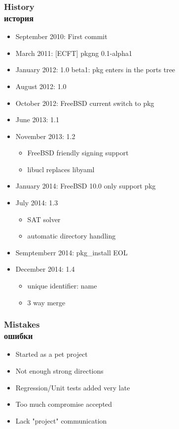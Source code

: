 \begin{frame}
	\frametitle{History \\ история}
	\begin{itemize}
		\item September 2010: First commit
		\item March 2011:  [ECFT] pkgng 0.1-alpha1
		\item January 2012: 1.0 beta1: pkg enters in the ports tree
		\item August 2012: 1.0
		\item October 2012: FreeBSD current switch to pkg
		\item June 2013: 1.1
		\item November 2013: 1.2
			\begin{itemize}
				\item FreeBSD friendly signing support
				\item libucl replaces libyaml
			\end{itemize}
		\item January 2014: FreeBSD 10.0 only support pkg
		\item July 2014: 1.3
			\begin{itemize}
				\item SAT solver
				\item automatic directory handling
			\end{itemize}
		\item Semptemberr 2014: pkg\_install EOL
		\item December 2014: 1.4
			\begin{itemize}
				\item unique identifier: name
				\item 3 way merge
			\end{itemize}
	\end{itemize}
\end{frame}

\begin{frame}
	\frametitle{Mistakes \\ ошибки}
	\begin{itemize}
		\item Started as a pet project
		\item Not enough strong directions
		\item Regression/Unit tests added very late
		\item Too much compromise accepted
		\item Lack "project" communication
	\end{itemize}
\end{frame}

